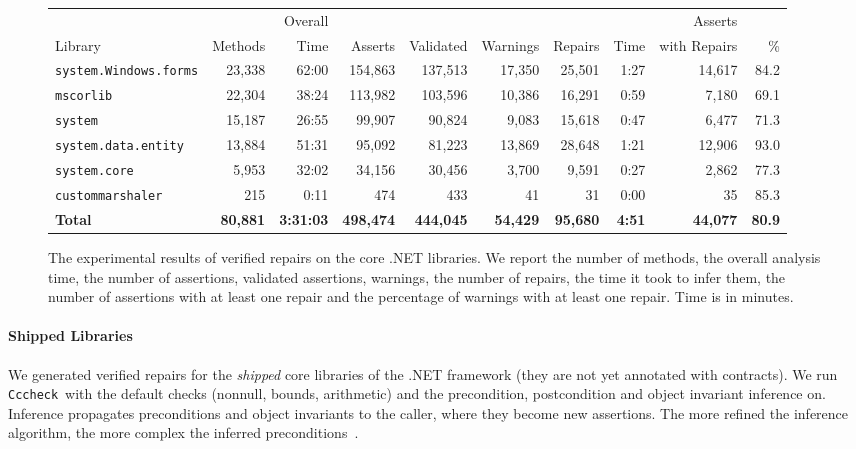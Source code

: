 \documentclass[10pt]{sigplanconf}
\newcommand{\labelFig}[1]{\label{fig:#1}}
\newcommand{\code}[1]{\texttt{#1}}
\newcommand{\Clousot}{\code{Cccheck}}
\begin{document}
\begin{figure}[t]
\centering
\begin{tabular}{@{}l | r r |r r r| r r | r r @{}}
                             &              & Overall    &            &            &               &             &       & Asserts          & \\
Library                      &      Methods &       Time & Asserts    & Validated  & Warnings      & Repairs     & Time  & with    Repairs  & \%    \\
\hline
\code{system.Windows.forms}  & 23,338       & 62:00      & 154,863    & 137,513    & 17,350        & 25,501      & 1:27  & 14,617           & 84.2 \\
\code{mscorlib}              & 22,304       & 38:24      & 113,982    & 103,596    & 10,386        & 16,291      & 0:59  & 7,180            & 69.1 \\ 
\code{system}                & 15,187       & 26:55      & 99,907    &  90,824    &  9,083        & 15,618      & 0:47  & 6,477            & 71.3 \\
\code{system.data.entity}    & 13,884       & 51:31      & 95,092    &  81,223    & 13,869        & 28,648      & 1:21  & 12,906           & 93.0 \\
\code{system.core}           &  5,953       & 32:02      & 34,156    &  30,456    &  3,700        & 9,591       & 0:27  & 2,862            & 77.3 \\
\code{custommarshaler}       &    215       &  0:11      &  474      &     433    &    41         &  31         & 0:00  &  35              & 85.3 \\
\hline
\textbf{Total}               &\textbf{80,881} &\textbf{3:31:03}     & \textbf{498,474}        & \textbf{444,045}    & \textbf{54,429}     & \textbf{95,680}    & \textbf{4:51}  & \textbf{44,077}                   &\textbf{80.9}
\end{tabular}
\caption{The experimental results of verified repairs on the core .NET libraries. 
We report the number of methods, the overall analysis time, the number of assertions, validated assertions, warnings, the
number of repairs, the time it took to infer them, the number of
assertions with at least one repair and the percentage of warnings with
at least one repair. Time is in minutes.}
\labelFig{experience}
\end{figure}




\paragraph{Shipped Libraries}
We generated verified repairs for the \emph{shipped} core libraries
of the .NET framework (they are not yet annotated with contracts).
We run \Clousot\ with the default checks (nonnull, bounds, arithmetic)
and the precondition, postcondition and object invariant inference on.
Inference propagates preconditions and object invariants to the
caller, where they become new assertions.  The more refined the
inference algorithm, the more complex the inferred
preconditions~\cite{CousotCousotLogozzo-VMCAI11}.  
\end{document}
